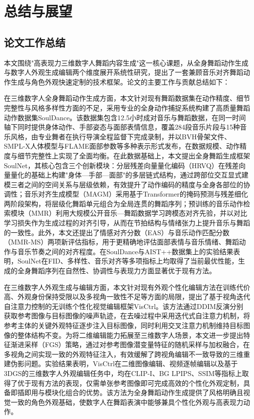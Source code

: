 \chapter{总结与展望}
\section{论文工作总结}

本文围绕"高表现力三维数字人舞蹈内容生成"这一核心课题，从全身舞蹈动作生成与数字人外观生成编辑两个维度展开系统性研究，提出了一套兼顾音乐对齐舞蹈动作生成与角色外观快速定制的技术框架。论文的主要工作与贡献总结如下：

在三维数字人全身舞蹈动作生成方面，本文针对现有舞蹈数据集在动作精度、细节完整性与风格多样性方面的不足，采用专业的全身动作捕捉系统构建了高质量舞蹈动作数据集SoulDance。该数据集包含12.5小时成对音乐与舞蹈数据，在同一时间轴下同时提供身体动作、手部姿态与面部表情信息，覆盖284段音乐片段与15种音乐风格，由专业舞者在执行导演全程监督下完成录制，并以BVH骨架文件、SMPL-X人体模型与FLAME面部参数等多种表示形式发布，在数据规模、动作精度与细节完整性上实现了全面均衡。在此数据基础上，本文提出全身舞蹈生成框架SoulNet，其核心包含三个创新模块：分层残差向量量化编码（HRVQ）在残差向量量化的基础上构建"身体—手部—面部"的多层链式结构，通过跨部位交互显式建模三者之间的空间关系与层级依赖，有效提升了动作编码的精度与全身各部位的协调性；音乐对齐生成模型（MAGM）采用基于Transformer的掩码预测与残差细化两阶段架构，将层级化舞蹈单元组合为全局连贯的舞蹈序列；预训练的音乐动作检索模块（MMR）利用大规模公开音乐—舞蹈数据学习跨模态对齐先验，并以对比学习损失作为生成过程的对齐引导，从而在节拍结构与情绪张力上提升音乐与舞蹈的一致性。此外，本文还提出了情感对齐分数（EAS）与音乐动作匹配分数（MMR-MS）两项新评估指标，用于更精确地评估面部表情与音乐情绪、舞蹈动作与音乐节奏之间的对齐程度。在SoulDance与AIST++数据集上的实验结果表明，SoulNet在FID、多样性、音乐对齐等多项指标上均取得了当前最优性能，生成的全身舞蹈序列在自然性、协调性与表现力方面显著优于现有方法。

在三维数字人外观生成与编辑方面，本文针对现有外观个性化编辑方法在训练代价高、外观身份保持受限以及多视角一致性不足等方面的局限，提出了基于视角迭代自注意力控制的无训练个性化视觉编辑框架VisCtrl。该方法通过DDIM反演分别获取参考图像与目标图像的噪声轨迹，在去噪过程中采用迭代式自注意力机制，将参考主体的关键外观特征逐步注入目标图像，同时利用交叉注意力机制维持目标图像的整体结构不变。为将二维编辑能力拓展至三维数字人场景，本文进一步提出特征渐进采样（FGS）策略，通过对参考图像潜变量特征的随机采样与加权融合，在多视角之间实现一致的外观特征注入，有效缓解了跨视角编辑不一致导致的三维重建伪影问题。实验结果表明，VisCtrl在二维图像编辑、视频逐帧编辑以及基于3DGS的三维数字人外观编辑任务中，均在CLIP-I、BG LPIPS、SSIM等指标上取得了优于现有方法的表现，仅需单张参考图像即可完成高效的个性化外观定制，具备即插即用与模块化组合的优势。该方法为全身舞蹈动作生成提供了风格明确且视觉一致的角色外观基础，使数字人在舞蹈表演中能够兼具个性化外观与高表现力动作。

